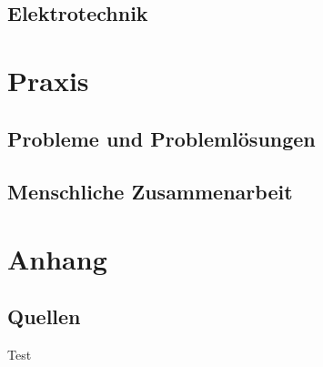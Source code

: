 \documentclass{report}
\begin{document}
\section{Elektrotechnik}

\chapter{Praxis}

\section{Probleme und Problemlösungen}

\section{Menschliche Zusammenarbeit}

\chapter{Anhang}
\section{Quellen}
Test
\end{document}
